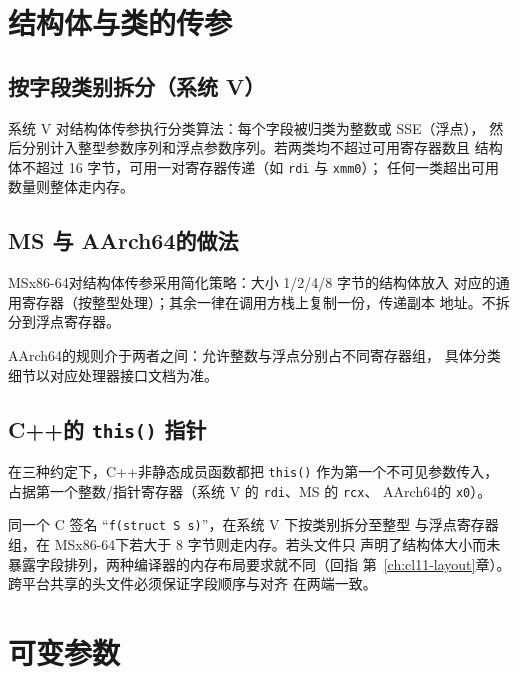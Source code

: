\documentclass[12pt,a4paper,fontset=fandol]{ctexbook}
\newcommand{\cpp}[1]{C++#1}
\newcommand{\Fn}[1]{\texttt{#1()}}
\newcommand{\Tp}[1]{\texttt{#1}}
\newcommand{\xSixtyFour}{\textsf{x86-64}}
\newcommand{\ArmSixtyFour}{\textsf{AArch64}}
\begin{document}
\section{结构体与类的传参}\label{sec:cl10-struct-pass}

\subsection{按字段类别拆分（系统 V）}\label{sec:cl10-sysv-split}

系统 V 对结构体传参执行分类算法：每个字段被归类为整数或 SSE（浮点），
然后分别计入整型参数序列和浮点参数序列。若两类均不超过可用寄存器数且
结构体不超过 16 字节，可用一对寄存器传递（如 \Tp{rdi} 与 \Tp{xmm0}）；
任何一类超出可用数量则整体走内存。

\subsection{MS 与 \ArmSixtyFour 的做法}\label{sec:cl10-ms-arm-struct}

MS\xSixtyFour 对结构体传参采用简化策略：大小 1/2/4/8 字节的结构体放入
对应的通用寄存器（按整型处理）；其余一律在调用方栈上复制一份，传递副本
地址。不拆分到浮点寄存器。

\ArmSixtyFour 的规则介于两者之间：允许整数与浮点分别占不同寄存器组，
具体分类细节以对应处理器接口文档为准。

\subsection{\cpp 的 \Fn{this} 指针}\label{sec:cl10-this}

在三种约定下，\cpp 非静态成员函数都把 \Fn{this} 作为第一个不可见参数传入，
占据第一个整数/指针寄存器（系统 V 的 \Tp{rdi}、MS 的 \Tp{rcx}、
\ArmSixtyFour 的 \Tp{x0}）。

\begin{warning}[title={传值布局依赖}]
同一个 C 签名 ``\Tp{f(struct S s)}''，在系统 V 下按类别拆分至整型
与浮点寄存器组，在 MS\xSixtyFour 下若大于 8 字节则走内存。若头文件只
声明了结构体大小而未暴露字段排列，两种编译器的内存布局要求就不同（回指
第~\ref{ch:cl11-layout}章）。跨平台共享的头文件必须保证字段顺序与对齐
在两端一致。
\end{warning}

\section{可变参数}\label{sec:cl10-variadic}
\end{document}
